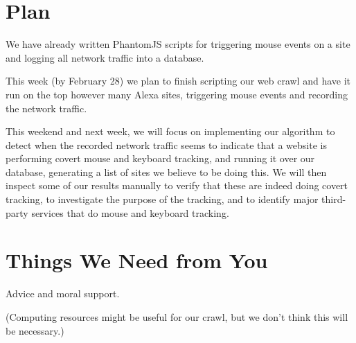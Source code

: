 \documentclass[letterpaper,twocolumn,10pt]{article}
\begin{document}
\section{Plan}

We have already written PhantomJS scripts for triggering mouse events on a site and logging all network traffic into a database.

This week (by February 28) we plan to finish scripting our web crawl and have it run on the top however many Alexa sites, triggering mouse events and recording the network traffic.

This weekend and next week, we will focus on implementing our algorithm to detect when the recorded network traffic seems to indicate that a website is performing covert mouse and keyboard tracking, and running it over our database, generating a list of sites we believe to be doing this. We will then inspect some of our results manually to verify that these are indeed doing covert tracking, to investigate the purpose of the tracking, and to identify major third-party services that do mouse and keyboard tracking.

\section{Things We Need from You}
Advice and moral support.

(Computing resources might be useful for our crawl, but we don't think this will be necessary.)

{\footnotesize 
}


\theendnotes
\end{document}
